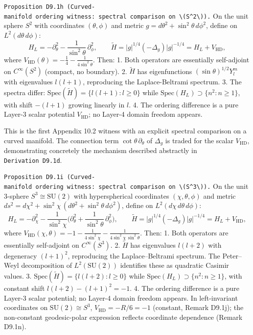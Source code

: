 \documentclass[
]{article}
\begin{document}
\texttt{Proposition\ D9.1h\ (Curved-manifold\ ordering\ witness:\ spectral\ comparison\ on\ \textbackslash{}(S\^{}2\textbackslash{})).}
On the unit sphere \(S^2\) with coordinates \((\theta,\phi)\) and metric
\(g=d\theta^2+\sin^2\!\theta\,d\phi^2\), define on
\(L^2(d\theta\,d\phi)\): \[
H_L=-\partial_\theta^2-\frac{1}{\sin^2\!\theta}\,\partial_\phi^2,
\qquad
\widetilde{H}=|g|^{1/4}(-\Delta_g)|g|^{-1/4}=H_L+V_{\mathrm{HD}},
\] where
\(V_{\mathrm{HD}}(\theta)=-\tfrac{1}{4}-\tfrac{1}{4\sin^2\!\theta}\).
Then: 1. Both operators are essentially self-adjoint on
\(C^\infty(S^2)\) (compact, no boundary). 2. \(\widetilde{H}\) has
eigenfunctions \((\sin\theta)^{1/2}Y_l^m\) with eigenvalues
\(l(l{+}1)\), reproducing the Laplace-Beltrami spectrum. 3. The spectra
differ: \(\mathrm{Spec}(\widetilde{H})=\{l(l{+}1):l\ge0\}\) while
\(\mathrm{Spec}(H_L)\supset\{n^2:n\ge1\}\), with shift \(-(l{+}1)\)
growing linearly in \(l\). 4. The ordering difference is a pure Layer-3
scalar potential \(V_{\mathrm{HD}}\); no Layer-4 domain freedom appears.

This is the first Appendix 10.2 witness with an explicit spectral
comparison on a curved manifold. The connection term
\(\cot\theta\,\partial_\theta\) of \(\Delta_g\) is traded for the scalar
\(V_{\mathrm{HD}}\), demonstrating concretely the mechanism described
abstractly in \texttt{Derivation\ D9.1d}.

\texttt{Proposition\ D9.1i\ (Curved-manifold\ ordering\ witness:\ spectral\ comparison\ on\ \textbackslash{}(S\^{}3\textbackslash{})).}
On the unit 3-sphere \(S^3\cong\mathrm{SU}(2)\) with hyperspherical
coordinates \((\chi,\theta,\phi)\) and metric
\(ds^2=d\chi^2+\sin^2\!\chi\,(d\theta^2+\sin^2\!\theta\,d\phi^2)\),
define on \(L^2(d\chi\,d\theta\,d\phi)\): \[
H_L=-\partial_\chi^2-\frac{1}{\sin^2\!\chi}\bigl(\partial_\theta^2+\frac{1}{\sin^2\!\theta}\,\partial_\phi^2\bigr),
\qquad
\widetilde{H}=|g|^{1/4}(-\Delta_g)|g|^{-1/4}=H_L+V_{\mathrm{HD}},
\] where
\(V_{\mathrm{HD}}(\chi,\theta)=-1-\frac{1}{4\sin^2\!\chi}-\frac{1}{4\sin^2\!\chi\,\sin^2\!\theta}\).
Then: 1. Both operators are essentially self-adjoint on
\(C^\infty(S^3)\). 2. \(\widetilde{H}\) has eigenvalues \(l(l{+}2)\)
with degeneracy \((l{+}1)^2\), reproducing the Laplace--Beltrami
spectrum. The Peter--Weyl decomposition of \(L^2(\mathrm{SU}(2))\)
identifies these as quadratic Casimir values. 3.
\(\mathrm{Spec}(\widetilde{H})=\{l(l{+}2):l\ge0\}\) while
\(\mathrm{Spec}(H_L)\supset\{n^2:n\ge1\}\), with constant shift
\(l(l{+}2)-(l{+}1)^2=-1\). 4. The ordering difference is a pure Layer-3
scalar potential; no Layer-4 domain freedom appears. In left-invariant
coordinates on \(\mathrm{SU}(2)\cong S^3\), \(V_{\mathrm{HD}}=-R/6=-1\)
(constant, Remark D9.1j); the non-constant geodesic-polar expression
reflects coordinate dependence (Remark D9.1n).
\end{document}
